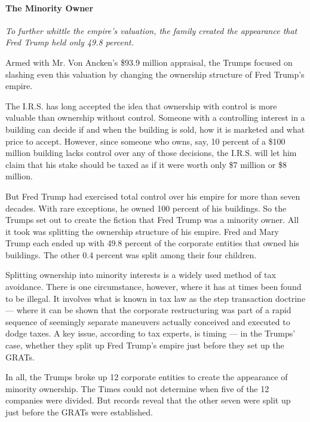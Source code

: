 \hypertarget{the-minority-owner}{%
\paragraph{The Minority Owner}\label{the-minority-owner}}

\emph{To further whittle the empire's valuation, the family created the
appearance that Fred Trump held only 49.8 percent.}

Armed with Mr. Von Ancken's \$93.9 million appraisal, the Trumps focused
on slashing even this valuation by changing the ownership structure of
Fred Trump's empire.

The I.R.S. has long accepted the idea that ownership with control is
more valuable than ownership without control. Someone with a controlling
interest in a building can decide if and when the building is sold, how
it is marketed and what price to accept. However, since someone who
owns, say, 10 percent of a \$100 million building lacks control over any
of those decisions, the I.R.S. will let him claim that his stake should
be taxed as if it were worth only \$7 million or \$8 million.

But Fred Trump had exercised total control over his empire for more than
seven decades. With rare exceptions, he owned 100 percent of his
buildings. So the Trumps set out to create the fiction that Fred Trump
was a minority owner. All it took was splitting the ownership structure
of his empire. Fred and Mary Trump each ended up with 49.8 percent of
the corporate entities that owned his buildings. The other 0.4 percent
was split among their four children.

Splitting ownership into minority interests is a widely used method of
tax avoidance. There is one circumstance, however, where it has at times
been found to be illegal. It involves what is known in tax law as the
step transaction doctrine --- where it can be shown that the corporate
restructuring was part of a rapid sequence of seemingly separate
maneuvers actually conceived and executed to dodge taxes. A key issue,
according to tax experts, is timing --- in the Trumps' case, whether
they split up Fred Trump's empire just before they set up the GRATs.

In all, the Trumps broke up 12 corporate entities to create the
appearance of minority ownership. The Times could not determine when
five of the 12 companies were divided. But records reveal that the other
seven were split up just before the GRATs were established.

